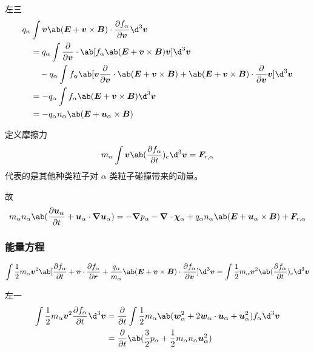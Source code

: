 左三
\begin{equation}\begin{aligned}
&q_\alpha \int
    \vec{v} \ab( \vec{E} + \vec{v} \times \vec{B} )
    \cdot \pdv{f_\alpha}{\vec{v}}
\d^3 \vec{v} \\
& \quad = q_\alpha \int \pdv{}{\vec{v}} \cdot \ab[
    f_\alpha \ab( \vec{E} + \vec{v} \times \vec{B} ) \vec{v}
] \d^3 \vec{v} \\
& \quad \quad - q_\alpha \int f_\alpha \ab[
    \vec{v} \pdv{}{\vec{v}} \cdot \ab( \vec{E} + \vec{v} \times \vec{B} )
    + \ab( \vec{E} + \vec{v} \times \vec{B} ) \cdot \pdv{}{\vec{v}} \vec{v}
] \d^3 \vec{v} \\
& \quad = - q_\alpha \int f_\alpha \ab( \vec{E} + \vec{v} \times \vec{B} ) \d^3 \vec{v} \\
& \quad = - q_\alpha n_\alpha \ab( \vec{E} + \vec{u}_\alpha \times \vec{B} )
\end{aligned}\end{equation}

定义摩擦力
\begin{equation}
    m_\alpha \int \vec{v} \ab( \pdv{f_\alpha}{t} )_c \d^3 \vec{v}
    = \vec{F}_{r,\alpha}
\end{equation}
代表的是其他种类粒子对 $\alpha$ 类粒子碰撞带来的动量。

故
\begin{equation}\label{eq:Fluid_动量方程}
m_\alpha n_\alpha \ab(
    \pdv{\vec{u}_\alpha}{t} + \vec{u}_\alpha \cdot \grad{\vec{u}_\alpha}
)
= - \grad{p_\alpha} - \dive{\vec{\chi}_\alpha} + q_\alpha n_\alpha \ab( \vec{E} + \vec{u}_\alpha \times \vec{B} ) + \vec{F}_{r,\alpha}
\end{equation}

\subsubsection{能量方程}

\begin{equation}
\int \frac{1}{2} m_\alpha \vec{v}^2 \ab[
    \pdv{f_\alpha}{t} + \vec{v} \cdot \pdv{f_\alpha}{\vec{r}} + \frac{q_\alpha}{m_\alpha} \ab( \vec{E} + \vec{v} \times \vec{B} ) \cdot \pdv{f_\alpha}{\vec{v}}
] \d^3 \vec{v}
= \int \frac{1}{2} m_\alpha \vec{v}^2 \ab( \pdv{f_\alpha}{t} )_c \d^3 \vec{v}
\end{equation}

左一
\begin{equation}\begin{aligned}
\int \frac{1}{2} m_\alpha \vec{v}^2 \pdv{f_\alpha}{t} \d^3 \vec{v}
&= \pdv{}{t} \int \frac{1}{2} m_\alpha \ab(
    \vec{w}_\alpha^2 + 2 \vec{w}_\alpha \cdot \vec{u}_\alpha + \vec{u}_\alpha^2
) f_\alpha \d^3 \vec{v} \\
&= \pdv{}{t} \ab(
    \frac{3}{2} p_\alpha + \frac{1}{2} m_\alpha n_\alpha \vec{u}_\alpha^2
)
\end{aligned}\end{equation}

